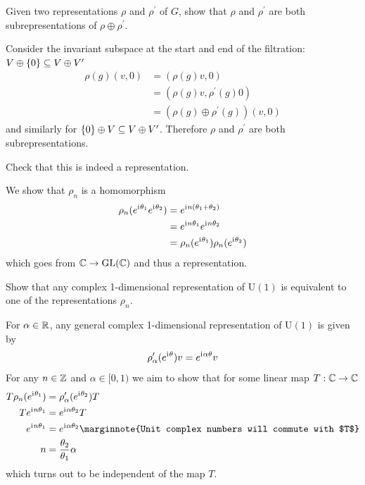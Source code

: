\documentclass[10pt]{article}
\begin{document}
\begin{example}
	Given two representations $\rho$ and $\rho^\prime$ of $G$, show that $\rho$ and $\rho^\prime$ are both subrepresentations of $\rho\oplus\rho^\prime$.
\end{example}
\sol Consider the invariant subspace at the start and end of the filtration: $V\oplus\lbrace0\rbrace \subseteq V\oplus V^\prime$
$$
\begin{aligned}
	\rho(g)(v,0) &= (\rho(g)v,0)\\
	&= (\rho(g)v,\rho^\prime(g)0)\\
	&= (\rho(g)\oplus\rho^\prime(g))(v,0)
\end{aligned}
$$
and similarly for $\lbrace0\rbrace\oplus V \subseteq V\oplus V^\prime$. Therefore $\rho$ and $\rho^\prime$ are both subrepresentations.


\begin{example}
	Check that this is indeed a representation.
\end{example}
\sol We show that $\rho_n$ is a homomorphism
$$
\begin{aligned}
	\rho_n(e^{\mathrm{i}\mkern1mu\theta_1}e^{\mathrm{i}\mkern1mu\theta_2}) &= e^{\mathrm{i}\mkern1mu n(\theta_1+\theta_2)}\\
	&= e^{\mathrm{i}\mkern1mu n\theta_1}e^{\mathrm{i}\mkern1mu n\theta_2}\\
	&= \rho_n(e^{\mathrm{i}\mkern1mu\theta_1})\rho_n(e^{\mathrm{i}\mkern1mu\theta_2})
\end{aligned}
$$
which goes from $\mathbb{C} \to \text{GL}(\mathbb{C})$ and thus a representation.


\begin{example}
	Show that any complex 1-dimensional representation of U$(1)$ is equivalent to one of the representations $\rho_n$.
\end{example}
\sol For $\alpha \in \mathbb{R}$, any general complex 1-dimensional representation of U$(1)$ is given by
$$
\rho^\prime_\alpha(e^{\mathrm{i}\mkern1mu \theta})v = e^{\mathrm{i}\mkern1mu \alpha\theta}v
$$
For any $n \in \mathbb{Z}$ and $\alpha \in [0,1)$ we aim to show that for some linear map $T:\mathbb{C}\to\mathbb{C}$
$$
\begin{aligned}
	T\rho_n(e^{\di \theta_1})&=\rho^\prime_\alpha(e^{\di \theta_2})T\\
	Te^{\di n\theta_1} &=e^{\di \alpha\theta_2}T\\
	e^{\di n\theta_1} &=e^{\di \alpha\theta_2}\marginnote{Unit complex numbers will commute with $T$}\\
	n &= \frac{\theta_2}{\theta_1}\alpha
\end{aligned}
$$ 
which turns out to be independent of the map $T$.
\end{document}
